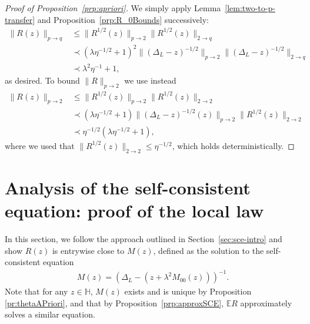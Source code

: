 \documentclass[11pt]{amsart}
\newcommand{\ldom}{\prec}
\numberwithin{equation}{section}
\numberwithin{theorem}{section}
\begin{document}
\begin{proof}[Proof of Proposition~\ref{prp:apriori}]
We simply apply Lemma~\ref{lem:two-to-p-transfer} and Proposition~\ref{prp:R_0Bounds} successively:
\begin{align*}
\|R(z)\|_{p\to q}&\leq \|R^{1 /2}(z)\|_{p\to 2}\|R^{1 /2}(z)\|_{2\to q}\\
&\prec (\lambda\eta^{-1/2}+1)^{2}\|(\Delta_L-z)^{-1/2}\|_{p \to 2}\|(\Delta_L-z)^{-1/2}\|_{2\to q}\\
&\prec \lambda^2\eta^{-1} + 1 ,
\end{align*}
as desired.  To bound $\|R\|_{p\to 2}$ we use instead
\begin{align*}
\|R(z)\|_{p\to 2}
&\leq \|R^{1/2}(z)\|_{p\to 2} \|R^{1/2}(z)\|_{2\to 2} \\
&\ldom (\lambda \eta^{-1/2}+1)\|(\Delta_L-z)^{-1/2}(z)\|_{p\to 2} \|R^{1/2}(z)\|_{2\to 2} \\
&\ldom \eta^{-1/2}(\lambda \eta^{-1/2}+1),
\end{align*}
where we used that $\|R^{1/2}(z)\|_{2\to 2} \leq \eta^{-1/2}$, which holds deterministically.
\end{proof}

\section{Analysis of the self-consistent equation: proof of the local law}
\label{sec:sce}
In this section, we follow the approach outlined in Section~\ref{sec:sce-intro}
and show $R(z)$ is entrywise close to $M(z)$, defined as the solution to the self-consistent equation
\begin{align}
\label{eq:def-of-M}
M(z) = (\Delta_L- (z+\lambda^2M_{00}(z)))^{-1}.
\end{align}
Note that for any $z\in \mathbb{H}$, $M(z)$ exists and is unique by Proposition \ref{pr:thetaAPriori}, and that by Proposition~\ref{prp:approxSCE}, $\mathbb{E} R$ approximately solves a similar equation.
\end{document}
